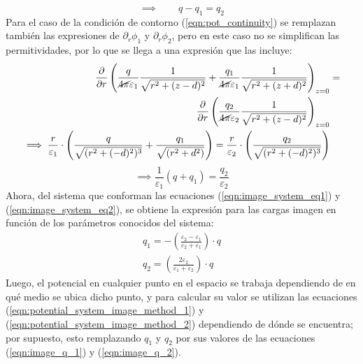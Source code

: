 \documentclass[12pt, twoside, onehalfspace, numbers, spanish]{ezthesis}
\numberwithin{equation}{section}
\begin{document}
\begin{equation}\label{eqn:image_system_eq1}
\implies \qquad q - q_1 = q_2
\end{equation}
Para el caso de la condición de contorno (\ref{eqn:pot_continuity}) se remplazan también las expresiones de $\partial_r\phi_1$ y $\partial_r\phi_2$, pero en este caso no se simplifican las permitividades, por lo que se llega a una expresión que las incluye:
\begin{align*}
\frac{\partial}{\partial r}\left(\frac{q}{\cancel{4\pi}\varepsilon_1}\frac{1}{\sqrt{r^2 + (z-d)^2}} + \frac{q_1}{\cancel{4\pi}\varepsilon_1}\frac{1}{\sqrt{r^2 + (z+d)^2}}\right)_{z=0}& =\\
\frac{\partial}{\partial r}\left(\frac{q_2}{\cancel{4\pi}\varepsilon_2}\frac{1}{\sqrt{r^2 + (z-d)^2}}\right)_{z=0}&\\
\implies \frac{r}{\varepsilon_1}\cdot\left(\frac{q}{\sqrt{(r^2 + (-d)^2)^3}}+ \frac{q_1}{\sqrt{(r^2 + d^2)}}\right) = \frac{r}{\varepsilon_2}\cdot\left(\frac{q_2}{\sqrt{(r^2 + (-d)^2)^3}}\right)&
\end{align*}
\begin{equation}\label{eqn:image_system_eq2}
\implies \frac{1}{\varepsilon_1}(q + q_1) = \frac{q_2}{\varepsilon_2}
\end{equation}
Ahora, del sistema que conforman las ecuaciones (\ref{eqn:image_system_eq1}) y (\ref{eqn:image_system_eq2}), se obtiene la expresión para las cargas imagen en función de los parámetros conocidos del sistema:
\begin{gather}
q_1 = -\left(\frac{\varepsilon_2 - \varepsilon_1}{\varepsilon_2 + \varepsilon_1}\right)\cdot q \label{eqn:image_q_1}\\
q_2 = \left(\frac{2\varepsilon_2}{\varepsilon_1 + \varepsilon_2}\right)\cdot q \label{eqn:image_q_2}
\end{gather}
Luego, el potencial en cualquier punto en el espacio se trabaja dependiendo de en qué medio se ubica dicho punto, y para calcular su valor se utilizan las ecuaciones (\ref{eqn:potential_system_image_method_1}) y (\ref{eqn:potential_system_image_method_2}) dependiendo de dónde se encuentra; por supuesto, esto remplazando $q_1$ y $q_2$ por sus valores de las ecuaciones (\ref{eqn:image_q_1}) y (\ref{eqn:image_q_2}).
\end{document}
